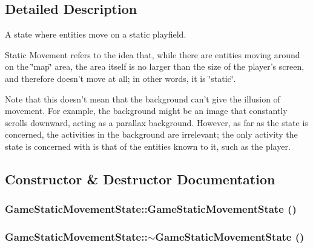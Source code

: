 \subsection{Detailed Description}
A state where entities move on a static playfield. 

Static Movement refers to the idea that, while there are entities moving around on the \char`\"{}map\char`\"{} area, the area itself is no larger than the size of the player's screen, and therefore doesn't move at all; in other words, it is \char`\"{}static\char`\"{}.

Note that this doesn't mean that the background can't give the illusion of movement. For example, the background might be an image that constantly scrolls downward, acting as a parallax background. However, as far as the state is concerned, the activities in the background are irrelevant; the only activity the state is concerned with is that of the entities known to it, such as the player. 

\subsection{Constructor \& Destructor Documentation}
\hypertarget{class_game_static_movement_state_13354d331108d7aeb78822e629d631b3}{
\subsubsection[{GameStaticMovementState}]{\setlength{\rightskip}{0pt plus 5cm}GameStaticMovementState::GameStaticMovementState ()}}
\label{d7/d3b/class_game_static_movement_state_13354d331108d7aeb78822e629d631b3}


\hypertarget{class_game_static_movement_state_3b89c6650fba993b81abd1d5b11a82c3}{
\subsubsection[{$\sim$GameStaticMovementState}]{\setlength{\rightskip}{0pt plus 5cm}GameStaticMovementState::$\sim$GameStaticMovementState ()}}
\label{d7/d3b/class_game_static_movement_state_3b89c6650fba993b81abd1d5b11a82c3}




